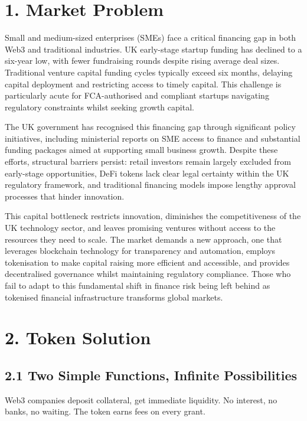 \documentclass[
  paper=a4,
  ,captions=tableheading
]{scrartcl}
\begin{document}
\section{1. Market Problem}\label{market-problem}

Small and medium-sized enterprises (SMEs) face a critical financing gap
in both Web3 and traditional industries. UK early-stage startup funding
has declined to a six-year low, with fewer fundraising rounds despite
rising average deal sizes. Traditional venture capital funding cycles
typically exceed six months, delaying capital deployment and restricting
access to timely capital. This challenge is particularly acute for
FCA-authorised and compliant startups navigating regulatory constraints
whilst seeking growth capital.

The UK government has recognised this financing gap through significant
policy initiatives, including ministerial reports on SME access to
finance and substantial funding packages aimed at supporting small
business growth. Despite these efforts, structural barriers persist:
retail investors remain largely excluded from early-stage opportunities,
DeFi tokens lack clear legal certainty within the UK regulatory
framework, and traditional financing models impose lengthy approval
processes that hinder innovation.

This capital bottleneck restricts innovation, diminishes the
competitiveness of the UK technology sector, and leaves promising
ventures without access to the resources they need to scale. The market
demands a new approach, one that leverages blockchain technology for
transparency and automation, employs tokenisation to make capital
raising more efficient and accessible, and provides decentralised
governance whilst maintaining regulatory compliance. Those who fail to
adapt to this fundamental shift in finance risk being left behind as
tokenised financial infrastructure transforms global markets.

\section{2. Token Solution}\label{token-solution}

\subsection{2.1 Two Simple Functions, Infinite
Possibilities}\label{two-simple-functions-infinite-possibilities}

Web3 companies deposit collateral, get immediate liquidity. No interest,
no banks, no waiting. The token earns fees on every grant.
\end{document}
